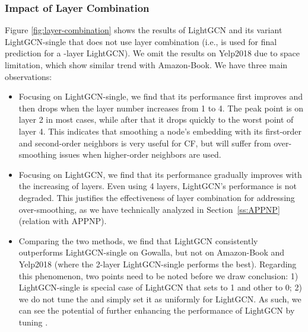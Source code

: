 \documentclass[sigconf]{acmart}
\theoremstyle{definition}
\begin{document}
\subsubsection{Impact of Layer Combination} Figure \ref{fig:layer-combination} shows the results of LightGCN and its variant LightGCN-single that does not use layer combination (i.e.,  is used for final prediction for a -layer LightGCN). We omit the results on Yelp2018 due to space limitation, which show similar trend with Amazon-Book. We have three main observations:
\begin{itemize}[leftmargin=*]
\item Focusing on LightGCN-single, we find that its performance first improves and then drops when the layer number increases from 1 to 4. The peak point is on layer 2 in most cases, while after that it drops quickly to the worst point of layer 4. This indicates that smoothing a node's embedding with its first-order and second-order neighbors is very useful for CF, but will suffer from over-smoothing issues when higher-order neighbors are used. 
\item Focusing on LightGCN, we find that its performance gradually improves with the increasing of layers. Even using 4 layers, LightGCN's performance is not degraded. This justifies the effectiveness of layer combination for addressing over-smoothing, as we have technically analyzed in Section~\ref{ss:APPNP} (relation with APPNP). 
\item Comparing the two methods, we find that LightGCN consistently outperforms LightGCN-single on Gowalla, but not on Amazon-Book and Yelp2018 (where the 2-layer LightGCN-single performs the best). Regarding this phenomenon, two points need to be noted before we draw conclusion: 1) LightGCN-single is special case of LightGCN that sets  to 1 and other  to 0; 2) we do not tune the  and simply set it as  uniformly for LightGCN. As such, we can see the potential of further enhancing the performance of LightGCN by tuning . 
\end{itemize}
\end{document}
